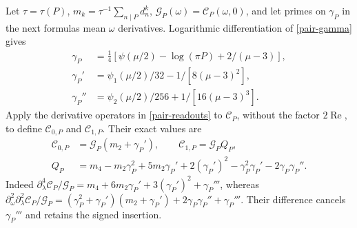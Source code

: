 \documentclass[11pt]{article}
\theoremstyle{definition}
\theoremstyle{remark}
\newcommand{\Rea}{\operatorname{Re}}
\begin{document}
Let $\tau=\tau(P)$, $m_k=\tau^{-1}\sum_{n\mid P}d_n^k$,
$\mathcal G_P(\omega)=\mathcal C_P(\omega,0)$, and let primes on $\gamma_P$
in the next formulas mean $\omega$ derivatives. Logarithmic
differentiation of \eqref{pair-gamma} gives
\begin{align}
 \gamma_P&=\tfrac14[\psi(\mu/2)-\log(\pi P)+2/(\mu-3)],\nonumber\\
 \gamma_P'&=\psi_1(\mu/2)/32-1/[8(\mu-3)^2],\nonumber\\
 \gamma_P''&=\psi_2(\mu/2)/256+1/[16(\mu-3)^3]. \label{pair-b}
\end{align}
Apply the derivative operators in \eqref{pair-readouts} to
$\mathcal C_P$, without the factor $2\Rea$, to define
$\mathcal C_{0,P}$ and $\mathcal C_{1,P}$. Their exact values are
\begin{align}
 \mathcal C_{0,P}&=\mathcal G_P(m_2+\gamma_P'),\qquad
 \mathcal C_{1,P}=\mathcal G_P Q_P,\nonumber\\
 Q_P&=m_4-m_2\gamma_P^2+5m_2\gamma_P'
 +2(\gamma_P')^2-\gamma_P^2\gamma_P'-2\gamma_P\gamma_P''.
 \label{pair-Q}
\end{align}
Indeed $\partial_\lambda^4\mathcal C_P/\mathcal G_P
=m_4+6m_2\gamma_P'+3(\gamma_P')^2+\gamma_P'''$, whereas
$\partial_\omega^2\partial_\lambda^2\mathcal C_P/\mathcal G_P
=(\gamma_P^2+\gamma_P')(m_2+\gamma_P')
+2\gamma_P\gamma_P''+\gamma_P'''$.
Their difference cancels $\gamma_P'''$ and retains the signed insertion.
\end{document}

